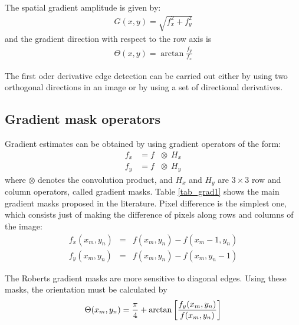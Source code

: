 
The spatial gradient amplitude is given by:
\begin{eqnarray}
G(x,y) = \sqrt{f_x^2 + f_y^2}
\end{eqnarray}
and the gradient direction with respect to the row axis is
\begin{eqnarray}
\Theta(x,y) = \arctan{\frac{f_y}{f_x}}
\end{eqnarray}

The first oder derivative edge detection can be carried out either by using
 two orthogonal directions in an image or by using a set of
directional derivatives. 
 
\subsection{Gradient mask operators}

Gradient estimates can be obtained by using gradient operators of the form:
\begin{eqnarray}
f_x & = f & \otimes  \ \ H_x \nonumber \\
f_y & = f & \otimes \ \ H_y 
\end{eqnarray}
where $\otimes$ denotes the convolution product, and $H_x$ and $H_y$ are $3
\times 3$
row and column operators, called gradient masks. Table \ref{tab_grad1} shows 
the main gradient masks proposed in the literature. Pixel difference is
the simplest one, which consists just of making the difference of   pixels
along rows and columns of the image:
\begin{eqnarray}
f_x(x_m, y_n) & = & f(x_m , y_n) - f(x_m-1, y_n) \nonumber \\
f_y(x_m, y_n) & = & f(x_m , y_n )- f(x_m, y_n-1)
\end{eqnarray}

The Roberts gradient masks \cite{edge:roberts65} are more sensitive 
to diagonal edges. Using these masks,
the orientation must be calculated by
\begin{eqnarray}
\Theta(x_m, y_n) = {\pi \over 4} + \arctan \left[ 
{f_y(x_m, y_n) \over f(x_m , y_n)} \right]
\end{eqnarray}

